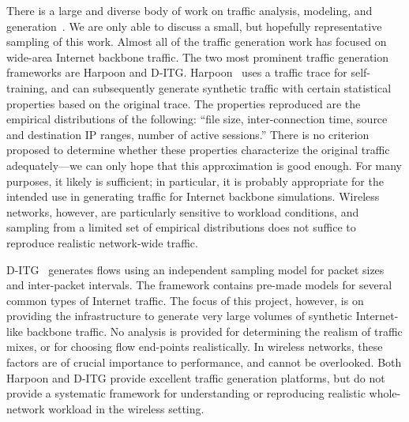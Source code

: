 \documentclass[conference]{IEEEtran}
\newcommand{\caps}[1]{{\small{#1}}}
\newcommand{\FHC}{Hern\'andez-Campos~\textit{et~al.}}
\begin{document}
There is a large and diverse body of work on traffic analysis, modeling, and generation~\cite{Paxson95,Paxson96,Sommers04,Avallone04,Hernandez06:dissertation}. We are only able to discuss a small, but hopefully representative sampling of this work. Almost all of the traffic generation work has focused on wide-area Internet backbone traffic.
The two most prominent traffic generation frameworks are Harpoon and \caps{D-ITG}. Harpoon~\cite{Sommers04} uses a traffic trace for self-training, and can subsequently generate synthetic traffic with certain statistical properties based on the original trace. The properties reproduced are the empirical distributions of the following: ``file size, inter-connection time, source and destination IP ranges, number of active sessions.'' There is no criterion proposed to determine whether these properties characterize the original traffic adequately---we can only hope that this approximation is good enough. For many purposes, it likely is sufficient; in particular, it is probably appropriate for the intended use in generating traffic for Internet backbone simulations. Wireless networks, however, are particularly sensitive to workload conditions, and sampling from a limited set of empirical distributions does not suffice to reproduce realistic network-wide traffic.

\caps{D-ITG}~\cite{Avallone04} generates flows using an independent sampling model for packet sizes and inter-packet intervals. The framework contains pre-made models for several common types of Internet traffic. The focus of this project, however, is on providing the infrastructure to generate very large volumes of synthetic Internet-like backbone traffic. No analysis is provided for determining the realism of traffic mixes, or for choosing flow end-points realistically. In wireless networks, these factors are of crucial importance to performance, and cannot be overlooked. Both Harpoon and \caps{D-ITG} provide excellent traffic generation platforms, but do not provide a systematic framework for understanding or reproducing realistic whole-network workload in the wireless setting.

\end{document}
